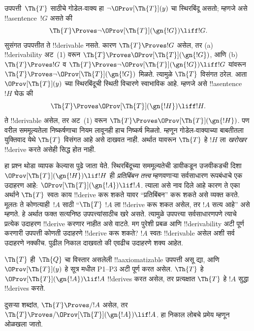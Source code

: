 \documentclass[../../../include/open-logic-section]{subfiles}
\begin{document}


उपपत्ती~$\Th{T}$ साठीचे गोडेल-वाक्य
हा $\lnot \OProv[\Th{T}](y)$ चा
स्थिरबिंदू असतो; म्हणजे असे
!!a{sentence}~$!G$ असते की
\[
\Th{T} \Proves \lnot \OProv[\Th{T}](\gn{!G}) \liff !G.
\]
सुसंगत उपपत्तीत ते !!{derivable} नसते. कारण
$\Th{T} \Proves !G$ असेल, तर
(a) !!{derivability} अट~(1) वरून
$\Th{T} \Proves \OProv[\Th{T}](\gn{!G})$,
आणि (b) $\Th{T}
\Proves !G$ व $\Th{T} \Proves \lnot \OProv[\Th{T}](\gn{!G})
\liff !G$ यांवरून
$\Th{T} \Proves \lnot \OProv[\Th{T}](\gn{!G})$
मिळते. त्यामुळे $\Th{T}$ विसंगत
ठरेल. आता $\OProv[\Th{T}](y)$
च्या स्थिरबिंदूची स्थिती विचारणे
स्वाभाविक आहे. म्हणजे असे
!!a{sentence}~$!H$ घेऊ की
\[
\Th{T} \Proves \OProv[\Th{T}](\gn{!H}) \liff !H.
\]
ते !!{derivable} असेल, तर
अट~(1) वरून
$\Th{T} \Proves \OProv[\Th{T}](\gn{!H})$.
पण वरील सममूल्यतेला
निष्कर्षणाचा नियम लावूनही
हाच निष्कर्ष मिळतो.
म्हणून गोडेल-वाक्याच्या
बाबतीतला युक्तिवाद येथे
$\Th{T}$ विसंगत आहे
असे दाखवत नाही.
अर्थात यावरून
$\Th{T}$ हे
$!H$ ला \emph{खरोखर}
!!{derive} करते असेही
सिद्ध होत नाही.

हा प्रश्न थोडा व्यापक
केल्यास पुढे जाता येते.
स्थिरबिंदूच्या
सममूल्यतेची
डावीकडून उजवीकडची
दिशा
$\OProv[\Th{T}](\gn{!H}) \lif !H$
ही \emph{प्रतिबिंबन तत्त्व}
म्हणवणाऱ्या सर्वसाधारण
रूपबंधाचे एक उदाहरण आहे:
$\OProv[\Th{T}](\gn{!A}) \lif !A$.
त्याला असे नाव दिले
आहे कारण ते एका
अर्थाने $\Th{T}$
स्वतः काय !!{derive}
करू शकते यावर
“प्रतिबिंबन” करू शकते
असे व्यक्त करते.
मूलतः ते कोणत्याही~$!A$
साठी “$\Th{T}$
$!A$ ला !!{derive}
करू शकत असेल, तर
$!A$ सत्य आहे”
असे म्हणते. हे
अर्थात फक्त सत्यनिष्ठ
उपपत्त्यांसाठीच खरे
असते. त्यामुळे
उपपत्त्या सर्वसाधारणपणे
त्याचे प्रत्येक उदाहरण
!!{derive} करणार नाहीत
असे वाटते. मग
पुरेशी प्रबळ आणि
!!{derivability} अटी
पूर्ण करणारी उपपत्ती
कोणती उदाहरणे
!!{derive} करू शकते?
$!A$ स्वतः
!!{derivable} असेल
अशी सर्व उदाहरणे
नक्कीच. पुढील
निकाल दाखवतो की
एवढीच उदाहरणे शक्य
आहेत.

\begin{thm}
$\Th{T}$ ही~$\Th{Q}$
चा विस्तार असलेली
!!a{axiomatizable}
उपपत्ती असू द्या,
आणि $\OProv[\Th{T}](y)$
हे सूत्र 
मधील P1--P3 अटी
पूर्ण करत असेल.
$\Th{T}$ हे
$\OProv[\Th{T}](\gn{!A}) \lif !A$
!!{derive}s करत
असेल, तर प्रत्यक्षात
$\Th{T}$ हे
$!A$ सुद्धा
!!{derive}s करते.
\end{thm}

दुसऱ्या शब्दांत,
$\Th{T} \Proves/ !A$
असेल, तर
$\Th{T} \Proves/
\OProv[\Th{T}](\gn{!A}) \lif !A$.
हा निकाल लोबचे
प्रमेय म्हणून ओळखला
जातो.
\end{document}
